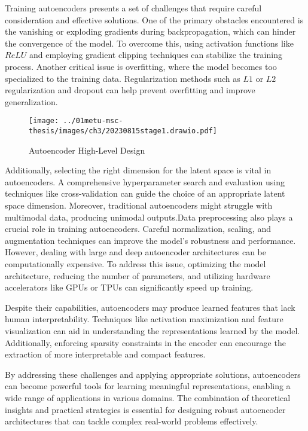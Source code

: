 Training autoencoders presents a set of challenges that require careful consideration and effective solutions. One of the primary obstacles encountered is the vanishing or exploding gradients during backpropagation, which can hinder the convergence of the model. To overcome this, using activation functions like $ReLU$ and employing gradient clipping techniques can stabilize the training process. Another critical issue is overfitting, where the model becomes too specialized to the training data. Regularization methods such as $L1$ or $L2$ regularization and dropout can help prevent overfitting and improve generalization.

\begin{figure}[htbp]
    \centering
    \texttt{[image: ../01metu-msc-thesis/images/ch3/20230815stage1.drawio.pdf]}
    \caption{Autoencoder High-Level Design}
    \label{fig:ch3:encoderhighlevel}
\end{figure}

Additionally, selecting the right dimension for the latent space is vital in autoencoders. A comprehensive hyperparameter search and evaluation using techniques like cross-validation can guide the choice of an appropriate latent space dimension. Moreover, traditional autoencoders might struggle with multimodal data, producing unimodal outputs.Data preprocessing also plays a crucial role in training autoencoders. Careful normalization, scaling, and augmentation techniques can improve the model's robustness and performance. However, dealing with large and deep autoencoder architectures can be computationally expensive. To address this issue, optimizing the model architecture, reducing the number of parameters, and utilizing hardware accelerators like GPUs or TPUs can significantly speed up training.

Despite their capabilities, autoencoders may produce learned features that lack human interpretability. Techniques like activation maximization and feature visualization can aid in understanding the representations learned by the model. Additionally, enforcing sparsity constraints in the encoder can encourage the extraction of more interpretable and compact features.

By addressing these challenges and applying appropriate solutions, autoencoders can become powerful tools for learning meaningful representations, enabling a wide range of applications in various domains. The combination of theoretical insights and practical strategies is essential for designing robust autoencoder architectures that can tackle complex real-world problems effectively.

